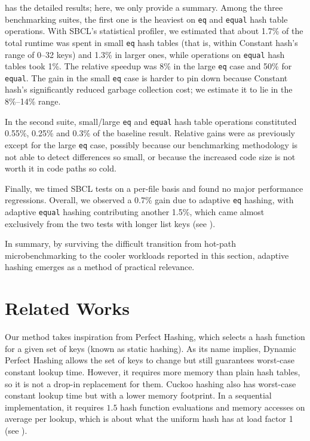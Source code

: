 \documentclass[sigconf]{acmart}
\newcommand*\lisp[1]{\texttt{#1}}
\begin{document}
 has the detailed results; here, we only provide a summary.
Among the three benchmarking suites, the first one is the heaviest on \lisp{eq} and \lisp{equal} hash table operations.
With SBCL's statistical profiler, we estimated that about 1.7\% of the total runtime was spent in small \lisp{eq} hash tables (that is, within Constant hash's range of 0--32 keys) and 1.3\% in larger ones, while operations on \lisp{equal} hash tables took 1\%.
The relative speedup was 8\% in the large \lisp{eq} case and 50\% for \lisp{equal}.
The gain in the small \lisp{eq} case is harder to pin down because Constant hash's significantly reduced garbage collection cost; we estimate it to lie in the 8\%--14\% range.

In the second suite, small/large \lisp{eq} and \lisp{equal} hash table operations constituted 0.55\%, 0.25\% and 0.3\% of the baseline result.
Relative gains were as previously except for the large \lisp{eq} case, possibly because our benchmarking methodology is not able to detect differences so small, or because the increased code size is not worth it in code paths so cold.

Finally, we timed SBCL tests on a per-file basis and found no major performance regressions.
Overall, we observed a 0.7\% gain due to adaptive \lisp{eq} hashing, with adaptive \lisp{equal} hashing contributing another 1.5\%, which came almost exclusively from the two tests with longer list keys (see ).

In summary, by surviving the difficult transition from hot-path microbenchmarking to the cooler workloads reported in this section, adaptive hashing emerges as a method of practical relevance.


\section{Related Works}

Our method takes inspiration from Perfect Hashing, which selects a hash function for a given set of keys (known as static hashing).
As its name implies, Dynamic Perfect Hashing \citep{dietzfelbinger1994dynamic,belazzougui2009hash} allows the set of keys to change but still guarantees worst-case constant lookup time.
However, it requires more memory than plain hash tables, so it is not a drop-in replacement for them.
Cuckoo hashing also has worst-case constant lookup time but with a lower memory footprint.
In a sequential implementation, it requires $1.5$ hash function evaluations and memory accesses on average per lookup, which is about what the uniform hash has at load factor 1 (see ).
\end{document}
